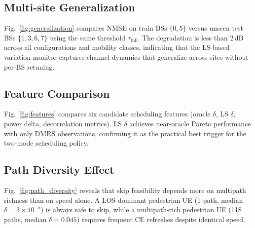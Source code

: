 
\subsection{Multi-site Generalization}

Fig.~\ref{fig:generalization} compares NMSE on train BSs $\{0, 5\}$ versus unseen test BSs $\{1, 3, 6, 7\}$ using the same threshold $\tau_{\mathrm{full}}$.
The degradation is less than 2\,dB across all configurations and mobility classes, indicating that the LS-based variation monitor captures channel dynamics that generalize across sites without per-BS retuning.

\subsection{Feature Comparison}

Fig.~\ref{fig:features} compares six candidate scheduling features (oracle $\delta$, LS $\delta$, power delta, decorrelation metrics).
LS $\delta$ achieves near-oracle Pareto performance with only DMRS observations, confirming it as the practical best trigger for the two-mode scheduling policy.

\subsection{Path Diversity Effect}

Fig.~\ref{fig:path_diversity} reveals that skip feasibility depends more on multipath richness than on speed alone.
A LOS-dominant pedestrian UE (1 path, median $\delta = 3 \times 10^{-5}$) is always safe to skip, while a multipath-rich pedestrian UE (118 paths, median $\delta = 0.045$) requires frequent CE refreshes despite identical speed.
